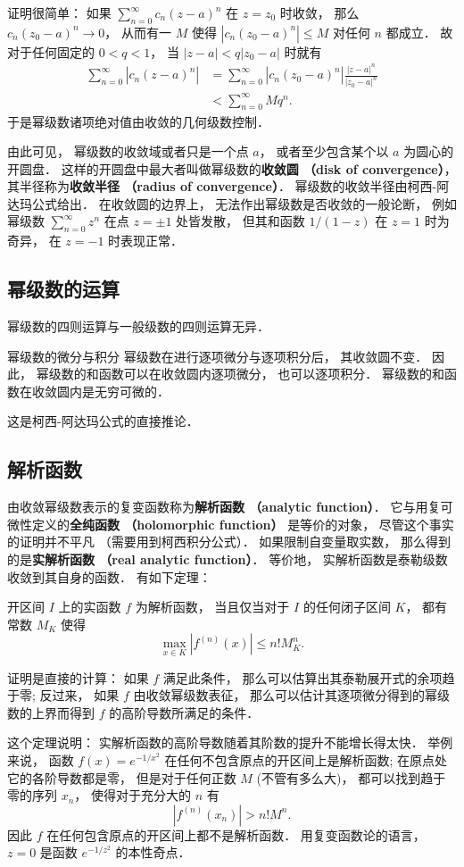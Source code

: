 证明很简单： 如果 $\sum_{n=0}^\infty c_n(z-a)^n$ 在 $z=z_0$ 时收敛， 那么 $c_n(z_0-a)^n\to0$， 从而有一 $M$ 使得 $|c_n(z_0-a)^n|\leq M$ 对任何 $n$ 都成立． 故对于任何固定的 $0<q<1$， 当 $|z-a|<q|z_0-a|$ 时就有
$$
\begin{aligned}
\sum_{n=0}^\infty |c_n(z-a)^n|
&=\sum_{n=0}^\infty |c_n(z_0-a)^n|\frac{|z-a|^n}{|z_0-a|^n}\\
&<\sum_{n=0}^\infty Mq^n.
\end{aligned}
$$
于是幂级数诸项绝对值由收敛的几何级数控制．

由此可见， 幂级数的收敛域或者只是一个点 $a$， 或者至少包含某个以 $a$ 为圆心的开圆盘． 这样的开圆盘中最大者叫做幂级数的\textbf{收敛圆 （disk of convergence）}， 其半径称为\textbf{收敛半径 （radius of convergence）}． 幂级数的收敛半径由柯西-阿达玛公式给出． 在收敛圆的边界上， 无法作出幂级数是否收敛的一般论断， 例如幂级数 $\sum_{n=0}^\infty z^n$ 在点 $z=\pm1$ 处皆发散， 但其和函数 $1/(1-z)$ 在 $z=1$ 时为奇异， 在 $z=-1$ 时表现正常．

\subsection{幂级数的运算}
幂级数的四则运算与一般级数的四则运算无异．

\begin{theorem}{幂级数的微分与积分}
幂级数在进行逐项微分与逐项积分后， 其收敛圆不变． 因此， 幂级数的和函数可以在收敛圆内逐项微分， 也可以逐项积分． 幂级数的和函数在收敛圆内是无穷可微的．
\end{theorem}
这是柯西-阿达玛公式的直接推论． 

\subsection{解析函数}
由收敛幂级数表示的复变函数称为\textbf{解析函数 （analytic function）}． 它与用复可微性定义的\textbf{全纯函数 （holomorphic function）} 是等价的对象， 尽管这个事实的证明并不平凡 （需要用到柯西积分公式）． 如果限制自变量取实数， 那么得到的是\textbf{实解析函数 （real analytic function）}． 等价地， 实解析函数是泰勒级数收敛到其自身的函数． 有如下定理：

\begin{theorem}{}
开区间 $I$ 上的实函数 $f$ 为解析函数， 当且仅当对于 $I$ 的任何闭子区间 $K$， 都有常数 $M_K$ 使得
$$
\max_{x\in K}|f^{(n)}(x)|\leq n!M_K^n.
$$
\end{theorem}

证明是直接的计算： 如果 $f$ 满足此条件， 那么可以估算出其泰勒展开式的余项趋于零; 反过来， 如果 $f$ 由收敛幂级数表征， 那么可以估计其逐项微分得到的幂级数的上界而得到 $f$ 的高阶导数所满足的条件．

这个定理说明： 实解析函数的高阶导数随着其阶数的提升不能增长得太快． 举例来说， 函数 $f(x)=e^{-1/x^2}$ 在任何不包含原点的开区间上是解析函数; 在原点处它的各阶导数都是零， 但是对于任何正数 $M$ (不管有多么大)， 都可以找到趋于零的序列 $x_n$， 使得对于充分大的 $n$ 有
$$
|f^{(n)}(x_n)|>n!M^n.
$$
因此 $f$ 在任何包含原点的开区间上都不是解析函数． 用复变函数论的语言， $z=0$ 是函数 $e^{-1/z^2}$ 的本性奇点．
